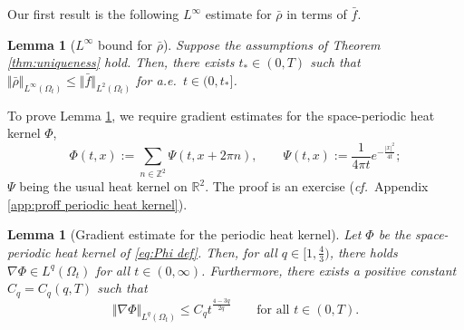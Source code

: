 \documentclass[11pt,a4paper,reqno]{amsart}
\newtheorem{lemma}[prop]{Lemma}
\theoremstyle{remark}
\theoremstyle{definition}
\numberwithin{equation}{section}
\begin{document}
Our first result is the following $L^\infty$ estimate for $\bar{\rho}$ in terms of $\bar{f}$. 


\begin{lemma}[$L^\infty$ bound for $\bar{\rho}$]\label{lem:bar rho quantitative Linfty bound}
Suppose the assumptions of Theorem \ref{thm:uniqueness} hold. Then, there exists $t_* \in (0,T)$ such that $\Vert \bar{\rho} \Vert_{L^\infty(\Omega_t)} \leq \Vert \bar{f} \Vert_{L^2(\Omega_t)}$ for a.e.~$t \in (0,t_*]$. 
\end{lemma}

To prove Lemma \ref{lem:bar rho quantitative Linfty bound}, we require gradient estimates for the space-periodic heat kernel $\Phi$, 
\begin{equation}\label{eq:Phi def}
    \Phi(t,x) := \sum_{n\in\mathbb{Z}^2} \Psi(t,x+2\pi n), \qquad \Psi(t,x) := \frac{1}{4\pi t}e^{-\frac{|x|^2}{4t}}; 
\end{equation}
$\Psi$ being the usual heat kernel on $\mathbb{R}^2$. The proof is an exercise (\textit{cf.}~Appendix \ref{app:proff periodic heat kernel}). 

\begin{lemma}[Gradient estimate for the periodic heat kernel]\label{lem:periodic heat kernel integ gradient}
 Let $\Phi$ be the space-periodic heat kernel of \eqref{eq:Phi def}. Then, for all $q \in [1,\frac{4}{3})$, there holds $\nabla \Phi \in L^q(\Omega_t) $ for all $t \in (0,\infty)$. Furthermore, there exists a positive constant $C_q=C_q(q,T)$ such that 
 \begin{equation*}
     \Vert \nabla \Phi \Vert_{L^q(\Omega_t)} \leq C_q t^{\frac{4-3q}{2q}} \qquad \text{for all } t \in (0,T). 
 \end{equation*}
\end{lemma}
\end{document}
